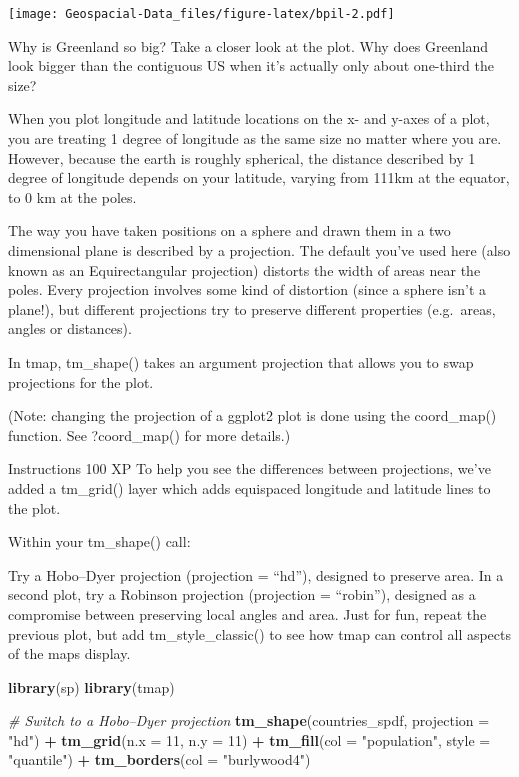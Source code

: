 \documentclass[]{article}
\newenvironment{Shaded}{\begin{snugshade}}{\end{snugshade}}
\newcommand{\CommentTok}[1]{\textcolor[rgb]{0.56,0.35,0.01}{\textit{#1}}}
\newcommand{\DataTypeTok}[1]{\textcolor[rgb]{0.13,0.29,0.53}{#1}}
\newcommand{\DecValTok}[1]{\textcolor[rgb]{0.00,0.00,0.81}{#1}}
\newcommand{\KeywordTok}[1]{\textcolor[rgb]{0.13,0.29,0.53}{\textbf{#1}}}
\newcommand{\NormalTok}[1]{#1}
\newcommand{\OperatorTok}[1]{\textcolor[rgb]{0.81,0.36,0.00}{\textbf{#1}}}
\newcommand{\StringTok}[1]{\textcolor[rgb]{0.31,0.60,0.02}{#1}}
\begin{document}
\texttt{[image: Geospacial-Data\_files/figure-latex/bpil-2.pdf]}

Why is Greenland so big? Take a closer look at the plot. Why does
Greenland look bigger than the contiguous US when it's actually only
about one-third the size?

When you plot longitude and latitude locations on the x- and y-axes of a
plot, you are treating 1 degree of longitude as the same size no matter
where you are. However, because the earth is roughly spherical, the
distance described by 1 degree of longitude depends on your latitude,
varying from 111km at the equator, to 0 km at the poles.

The way you have taken positions on a sphere and drawn them in a two
dimensional plane is described by a projection. The default you've used
here (also known as an Equirectangular projection) distorts the width of
areas near the poles. Every projection involves some kind of distortion
(since a sphere isn't a plane!), but different projections try to
preserve different properties (e.g.~areas, angles or distances).

In tmap, tm\_shape() takes an argument projection that allows you to
swap projections for the plot.

(Note: changing the projection of a ggplot2 plot is done using the
coord\_map() function. See ?coord\_map() for more details.)

Instructions 100 XP To help you see the differences between projections,
we've added a tm\_grid() layer which adds equispaced longitude and
latitude lines to the plot.

Within your tm\_shape() call:

Try a Hobo--Dyer projection (projection = ``hd''), designed to preserve
area. In a second plot, try a Robinson projection (projection =
``robin''), designed as a compromise between preserving local angles and
area. Just for fun, repeat the previous plot, but add
tm\_style\_classic() to see how tmap can control all aspects of the maps
display.

\begin{Shaded}
\begin{Highlighting}[]
\KeywordTok{library}\NormalTok{(sp)}
\KeywordTok{library}\NormalTok{(tmap)}

\CommentTok{# Switch to a Hobo–Dyer projection}
\KeywordTok{tm_shape}\NormalTok{(countries_spdf, }\DataTypeTok{projection =} \StringTok{"hd"}\NormalTok{) }\OperatorTok{+}
\StringTok{  }\KeywordTok{tm_grid}\NormalTok{(}\DataTypeTok{n.x =} \DecValTok{11}\NormalTok{, }\DataTypeTok{n.y =} \DecValTok{11}\NormalTok{) }\OperatorTok{+}
\StringTok{  }\KeywordTok{tm_fill}\NormalTok{(}\DataTypeTok{col =} \StringTok{"population"}\NormalTok{, }\DataTypeTok{style =} \StringTok{"quantile"}\NormalTok{)  }\OperatorTok{+}
\StringTok{  }\KeywordTok{tm_borders}\NormalTok{(}\DataTypeTok{col =} \StringTok{"burlywood4"}\NormalTok{) }
\end{Highlighting}
\end{Shaded}
\end{document}
